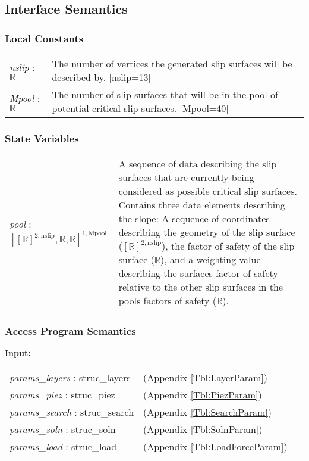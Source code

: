 \documentclass[12pt]{article}
\begin{document}
\subsection{Interface Semantics}

\subsubsection{Local Constants}
\renewcommand*{\arraystretch}{1.5}
\begin{longtable}{p{} p{}}
  \textit{nslip} : $\mathbb{R}$ & The number of vertices the generated
  slip surfaces will be described by. [nslip=13] \\

  \textit{Mpool} : $\mathbb{R}$ & The number of slip surfaces that
  will be in the pool of potential critical slip surfaces. [Mpool=40]
\end{longtable}

\subsubsection{State Variables}
\renewcommand*{\arraystretch}{1.5}
\begin{longtable}{p{} p{}}
  \textit{pool} : $[[\mathbb{R}]^{2,\text{nslip}}, \mathbb{R},
    \mathbb{R}]^{1,\text{Mpool}}$ & A sequence of data describing the
  slip surfaces that are currently being considered as possible
  critical slip surfaces. Contains three data elements describing the
  slope: A sequence of coordinates describing the geometry of the slip
  surface ($[\mathbb{R}]^{2,\text{nslip}}$), the factor of safety of
  the slip surface ($\mathbb{R}$), and a weighting value describing
  the surfaces factor of safety relative to the other slip surfaces in
  the pools factors of safety ($\mathbb{R}$). \\
\end{longtable}

\subsubsection{Access Program Semantics}
\textbf{Input:} 
\renewcommand*{\arraystretch}{1.5}
\begin{longtable}{p{} p{}}
\textit{params\_layers} : struc\_layers & (Appendix \ref{Tbl:LayerParam})\\

\textit{params\_piez} : struc\_piez & (Appendix \ref{Tbl:PiezParam})\\

\textit{params\_search} : struc\_search & (Appendix
\ref{Tbl:SearchParam})\\

\textit{params\_soln} : struc\_soln & (Appendix
\ref{Tbl:SolnParam})\\

\textit{params\_load} : struc\_load & (Appendix
\ref{Tbl:LoadForceParam})\\
\end{longtable}
\end{document}
